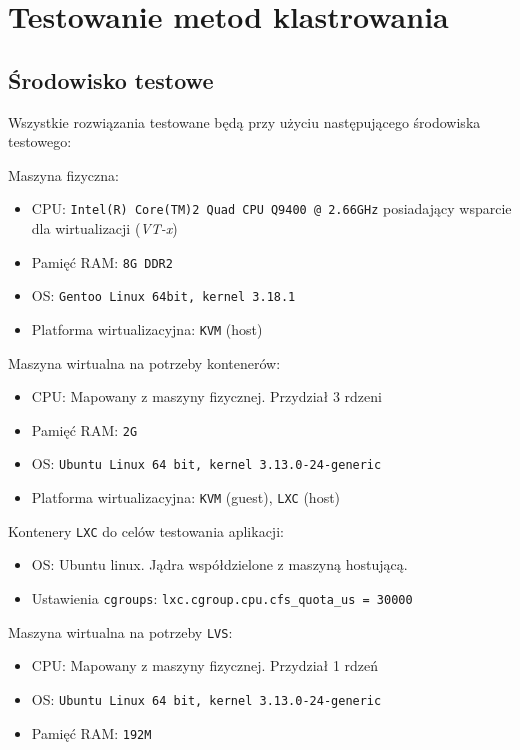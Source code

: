 \chapter{Testowanie metod klastrowania}
\section{Środowisko testowe}
Wszystkie rozwiązania testowane będą przy użyciu następującego środowiska testowego:
\begin{description}
\item{Maszyna fizyczna:}
    \begin{itemize}
	\item CPU: \texttt{Intel(R) Core(TM)2 Quad CPU    Q9400 @ 2.66GHz} posiadający wsparcie dla wirtualizacji (\textit{VT-x})
	\item Pamięć RAM: \texttt{8G DDR2}
	\item OS: \texttt{Gentoo Linux 64bit, kernel 3.18.1}
	\item Platforma wirtualizacyjna: \texttt{KVM} (host)
    \end{itemize}
\item{Maszyna wirtualna na potrzeby kontenerów:}
    \begin{itemize}
	\item CPU: Mapowany z maszyny fizycznej. Przydział 3 rdzeni
	\item Pamięć RAM: \texttt{2G}
	\item OS: \texttt{Ubuntu Linux 64 bit, kernel 3.13.0-24-generic}
	\item Platforma wirtualizacyjna: \texttt{KVM} (guest), \texttt{LXC} (host)
    \end{itemize}
\item{Kontenery \texttt{LXC} do celów testowania aplikacji:}
    \begin{itemize}
	\item OS: Ubuntu linux. Jądra współdzielone z maszyną hostującą.
	\item Ustawienia \texttt{cgroups}: \texttt{lxc.cgroup.cpu.cfs\_quota\_us = 30000}
    \end{itemize}
\item{Maszyna wirtualna na potrzeby \texttt{LVS}:}
    \begin{itemize}
	\item CPU: Mapowany z maszyny fizycznej. Przydział 1 rdzeń
	\item OS: \texttt{Ubuntu Linux 64 bit, kernel 3.13.0-24-generic}
	\item Pamięć RAM: \texttt{192M}
    \end{itemize}
\end{description}
